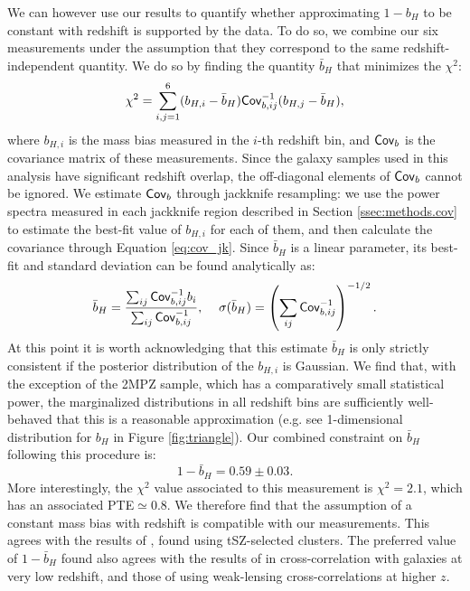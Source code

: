 \documentclass[useAMS,usenatbib]{mn2e}
\begin{document}
      We can however use our results to quantify whether approximating $1-b_H$ to be constant with redshift is supported by the data. To do so, we combine our six measurements under the assumption that they correspond to the same redshift-independent quantity. We do so by finding the quantity $\bar{b}_H$ that minimizes the $\chi^2$:
      \begin{equation}
        \chi^2=\sum_{i,j=1}^6 (b_{H,i}-\bar{b}_H){\sf Cov}^{-1}_{b,ij}(b_{H,j}-\bar{b}_H),
      \end{equation}
      where $b_{H,i}$ is the mass bias measured in the $i$-th redshift bin, and ${\sf Cov}_b$ is the covariance matrix of these measurements. Since the galaxy samples used in this analysis have significant redshift overlap, the off-diagonal elements of ${\sf Cov}_b$ cannot be ignored. We estimate ${\sf Cov}_b$ through jackknife resampling: we use the power spectra measured in each jackknife region described in Section \ref{ssec:methods.cov} to estimate the best-fit value of $b_{H,i}$ for each of them, and then calculate the covariance through Equation \ref{eq:cov_jk}. Since $\bar{b}_H$ is a linear parameter, its best-fit and standard deviation can be found analytically as:
      \begin{equation}
        \bar{b}_H=\frac{\sum_{ij}{\sf Cov}_{b,ij}^{-1}b_i}{\sum_{ij}{\sf Cov}^{-1}_{b,ij}},
        \hspace{12pt}
        \sigma(\bar{b}_H)=\left(\sum_{ij}{\sf Cov}^{-1}_{b,ij}\right)^{-1/2}.
      \end{equation}
      At this point it is worth acknowledging that this estimate $\bar{b}_H$ is only strictly consistent if the posterior distribution of the $b_{H,i}$ is Gaussian. We find that, with the exception of the 2MPZ sample, which has a comparatively small statistical power, the marginalized distributions in all redshift bins are sufficiently well-behaved that this is a reasonable approximation (e.g. see 1-dimensional distribution for $b_H$ in Figure \ref{fig:triangle}). Our combined constraint on $\bar{b}_H$ following this procedure is:
      \begin{equation}
        1-\bar{b}_H=0.59\pm0.03.
      \end{equation}
      More interestingly, the $\chi^2$ value associated to this measurement is $\chi^2=2.1$, which has an associated PTE$\simeq0.8$. We therefore find that the assumption of a constant mass bias with redshift is compatible with our measurements. This agrees with the results of \cite{2019A&A...626A..27S}, found using tSZ-selected clusters. The preferred value of $1-\bar{b}_H$ found also agrees with the results of \cite{2018MNRAS.480.3928M} in cross-correlation with galaxies at very low redshift, and those of \cite{2019arXiv190707870M} using weak-lensing cross-correlations at higher $z$. 
\end{document}
